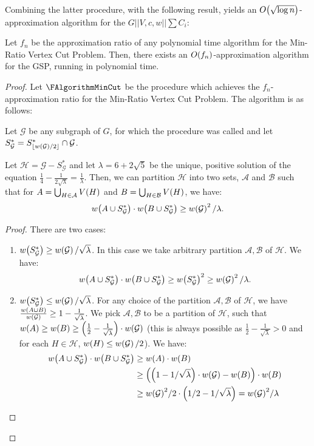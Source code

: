 Combining the latter procedure, with the following result, yields an $O\mathopen{}\left( \sqrt{\log n
} \right)$-approximation algorithm for the $G||V,c,w||\sum C_i$:
\begin{theorem}
    Let $f_n$ be the approximation ratio of any polynomial time algorithm for the Min-Ratio Vertex Cut Problem. Then, there exists an $O\mathopen{}\left( f_n \right)$-approximation algorithm for the GSP, running in polynomial time.
    \begin{proof}
        Let $\FAlgorithmMinCut$ be the procedure which achieves the $f_n$-approximation ratio for the Min-Ratio Vertex Cut Problem.
        The algorithm is as follows:
        
        
        Let $\mathcal{G}$ be any subgraph of $G$, for which the procedure was called and let $S_{\mathcal{G}}^*=S_{\mathopen{}\left\lfloor w\mathopen{}\left( \mathcal{G} \right)/2 \right\rfloor}^*\cap \mathcal{G}$.
        \begin{lemma}\label{lambda_lemma}
            Let $\mathcal{H}=\mathcal{G}-S_{\mathcal{G}}^*$ and let $\lambda=6+2\sqrt{5}$ be the unique, positive solution of the equation $\frac{1}{4}-\frac{1}{2\sqrt{\lambda}}=\frac{1}{\lambda}$. Then, we can partition $\mathcal{H}$ into two sets, $\mathcal{A}$ and $\mathcal{B}$ such that for $A=\bigcup_{H\in\mathcal{A}}V\mathopen{}\left( H \right)$ and $B=\bigcup_{H\in\mathcal{B}}V\mathopen{}\left( H \right)$, we have:
            $$w\mathopen{}\left( A\cup S_{\mathcal{G}}^* \right)\cdot w\mathopen{}\left( B\cup S_{\mathcal{G}}^* \right)\geq w\mathopen{}\left( \mathcal{G} \right)^2/\lambda.$$
            
            \begin{proof}
                There are two cases:
                \begin{enumerate}
                    \item $w\mathopen{}\left(  S_{\mathcal{G}}^* \right)\geq w\mathopen{}\left( \mathcal{G} \right)/\sqrt{\lambda}$. In this case we take arbitrary partition $\mathcal{A}, \mathcal{B}$ of $\mathcal{H}$. We have:
                    $$w\mathopen{}\left( A\cup S_{\mathcal{G}}^* \right)\cdot w\mathopen{}\left( B\cup S_{\mathcal{G}}^* \right)\geq w\mathopen{}\left(  S_{\mathcal{G}}^* \right)^2 \geq w\mathopen{}\left( \mathcal{G} \right)^2/\lambda.$$
                \item $w\mathopen{}\left(  S_{\mathcal{G}}^* \right) \leq w\mathopen{}\left( \mathcal{G} \right)/\sqrt{\lambda}$.
                For any choice of the partition $\mathcal{A},\mathcal{B}$ of $\mathcal{H}$, we have $\frac{w\mathopen{}\left( A\cup B \right)}{w\mathopen{}\left( \mathcal{G} \right)}\geq 1-\frac{1}{\sqrt{\lambda}}$. We pick $\mathcal{A},\mathcal{B}$ to be a partition of $\mathcal{H}$, such that $w\mathopen{}\left( A \right)\geq w\mathopen{}\left( B \right)\geq \mathopen{}\left( \frac{1}{2}-\frac{1}{\sqrt{\lambda}} \right)\cdot w\mathopen{}\left( \mathcal{G} \right)$ (this is always possible as $\frac{1}{2}-\frac{1}{\sqrt{\lambda}}>0$ and for each $H\in\mathcal{H}$, $w\mathopen{}\left( H \right)\leq w\mathopen{}\left( \mathcal{G} \right)/2$). We have:
                \begin{align*}
                w\mathopen{}\left( A\cup S_{\mathcal{G}}^* \right)\cdot w\mathopen{}\left( B\cup S_{\mathcal{G}}^* \right)&\geq w\mathopen{}\left( A \right)\cdot w\mathopen{}\left( B \right) \\&\geq \mathopen{}\left( \mathopen{}\left( 1-{1}/{\sqrt{\lambda}} \right)\cdot w\mathopen{}\left( \mathcal{G} \right)-w\mathopen{}\left( B \right) \right)\cdot w\mathopen{}\left( B \right)\\&\geq  {w\mathopen{}\left( \mathcal{G} \right)^2}/{2}\cdot \mathopen{}\left( {1}/{2}-{1}/{\sqrt{\lambda}} \right) = {w\mathopen{}\left( \mathcal{G} \right)^2}/{\lambda}    
                \end{align*}
                

\end{enumerate}
\end{proof}
\end{lemma}
\end{proof}
\end{theorem}

